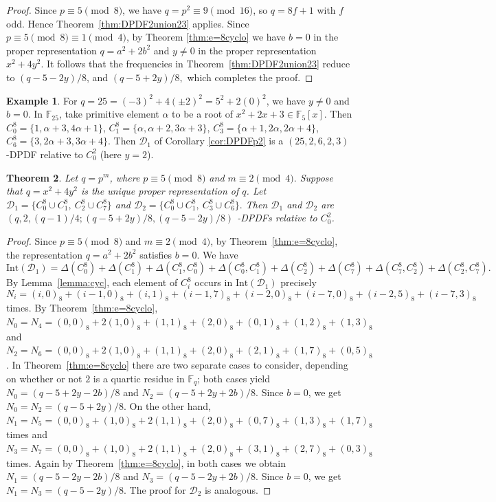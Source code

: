 \documentclass[12pt, a4paper]{article}
\newtheorem{theorem}{Theorem}[section]
\theoremstyle{definition}
\newtheorem{example}[theorem]{Example}
\begin{document}
\begin{proof}
	Since $p\equiv5\pmod8$, we have $q=p^2\equiv9\pmod{16}$, so $q=8f+1$
	with $f$ odd. Hence Theorem~\ref{thm:DPDF2union23} applies. Since $p\equiv5\pmod8 \equiv 1 \pmod 4$, by Theorem \ref{thm:e=8cyclo} we have $b=0$ in the
	proper representation $q=a^2+2b^2$ and $y \neq 0$ in the proper representation $x^2+4y^2$. It follows that the frequencies in
	Theorem~\ref{thm:DPDF2union23} reduce to
	$
	(q-5-2y)/8$, and $ (q-5+2y)/8,
	$ 
	which completes the proof.
\end{proof}

\begin{example}
For $q=25=(-3)^2+4(\pm2)^2=5^2+2(0)^2$, we have $y \neq 0$ and $b=0$.  In $\mathbb{F}_{25}$, take primitive element $\alpha$ to be a root of $x^2+2x+3 \in \mathbb{F}_5[x]$. Then $C_0^8=\{1, \alpha+3, 4 \alpha+1\}$, $C_1^8=\{\alpha,\alpha+2,3\alpha+3\}$, $C_3^8=\{\alpha+1,2\alpha,2\alpha+4\}$, $C_6^8=\{3,2\alpha+3,3\alpha+4\}$. Then $\mathcal D_1$ of Corollary \ref{cor:DPDFp2} is a $(25,2,6,2,3)$-DPDF relative to $C_0^2$ (here $y=2$).
\end{example}

\begin{theorem}\label{thm:DPDF2union0127-01361}
	Let \(q=p^m\), where
	$
	p\equiv5\pmod8
	$
	and
	$
	m\equiv2\pmod4.
	$
	Suppose that $q=x^2+4y^2$
	is the unique proper representation of \(q\). Let
	$
	\mathcal D_1=\{C_0^8\cup C_1^8,\ C_2^8\cup C_7^8\}
	$
	and
	$
	\mathcal D_2=\{C_0^8\cup C_1^8,\ C_3^8\cup C_6^8\}.
	$
	Then \(\mathcal D_1\) and \(\mathcal D_2\) are
	$
	(q,2,(q-1)/4;(q-5+2y)/8,(q-5-2y)/8)
	$
	-DPDFs relative to \(C_0^2\).
\end{theorem}

\begin{proof}
	Since \(p\equiv5\pmod8\) and \(m\equiv2\pmod4\), by
	Theorem~\ref{thm:e=8cyclo}, the representation
	$
	q=a^2+2b^2
	$
	satisfies \(b=0\). We have
	\[
	\mathrm{Int}(\mathcal D_1)
	=\Delta(C_0^8)+\Delta(C_1^8)
	+\Delta(C_1^8,C_0^8)+\Delta(C_0^8,C_1^8)
	+\Delta(C_2^8)+\Delta(C_7^8)
	+\Delta(C_7^8,C_2^8)+\Delta(C_2^8,C_7^8).
	\]
	By Lemma~\ref{lemma:cyc}, each element of \(C_i^8\) occurs in \(\mathrm{Int}(\mathcal D_1)\)
	precisely
	\[
	N_i=(i,0)_8+(i-1,0)_8+(i,1)_8+(i-1,7)_8
	+(i-2,0)_8+(i-7,0)_8+(i-2,5)_8+(i-7,3)_8
	\]
	times. By Theorem~\ref{thm:e=8cyclo}, $N_0=N_4=(0,0)_8+2(1,0)_8+(1,1)_8+(2,0)_8
	+(0,1)_8+(1,2)_8+(1,3)_8
	$
	and 
	$
	N_2=N_6=(0,0)_8+2(1,0)_8+(1,1)_8+(2,0)_8
	+(2,1)_8+(1,7)_8+(0,5)_8
	$. In Theorem~\ref{thm:e=8cyclo} there are two
	separate cases to consider, depending on whether or not \(2\) is a quartic 
	residue  in \(\mathbb F_q\); both cases yield
	$
	N_0=(q-5+2y-2b)/8
	$
	and
	$
	N_2=(q-5+2y+2b)/8.
	$
	Since \(b=0\), we get
	$
	N_0=N_2=(q-5+2y)/8.
	$
	On the other hand,
	$
	N_1=N_5=(0,0)_8+(1,0)_8+2(1,1)_8+(2,0)_8
	+(0,7)_8+(1,3)_8+(1,7)_8
	$
	times
    and
    $N_3=N_7=(0,0)_8+(1,0)_8+2(1,1)_8+(2,0)_8
	+(3,1)_8+(2,7)_8+(0,3)_8
	$
	times. Again by Theorem~\ref{thm:e=8cyclo}, in both cases we obtain
	$
	N_1=(q-5-2y-2b)/8
	$
	and
	$
	N_3=(q-5-2y+2b)/8.
	$
	Since \(b=0\), we get
	$
	N_1=N_3=(q-5-2y)/8.
	$
The proof for $\mathcal{D}_2$ is analogous.
\end{proof}
\end{document}
